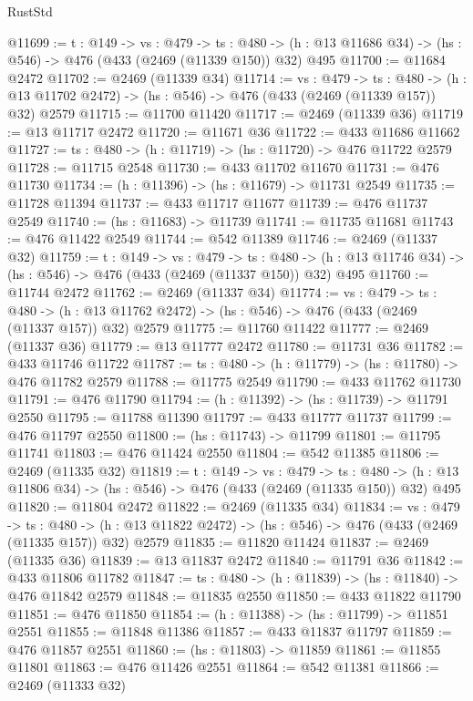 \begin{lexlean}{RustStd}
\begin{coremodule}
@11699 := {t : @149} ->
  {vs : @479} ->
  {ts : @480} -> (h : @13 @11686 @34) -> (hs : @546) -> @476 (@433 (@2469 (@11339 @150)) @32) @495
@11700 := @11684 @2472
@11702 := @2469 (@11339 @34)
@11714 := {vs : @479} ->
  {ts : @480} ->
  (h : @13 @11702 @2472) -> (hs : @546) -> @476 (@433 (@2469 (@11339 @157)) @32) @2579
@11715 := @11700 @11420
@11717 := @2469 (@11339 @36)
@11719 := @13 @11717 @2472
@11720 := @11671 @36
@11722 := @433 @11686 @11662
@11727 := {ts : @480} -> (h : @11719) -> (hs : @11720) -> @476 @11722 @2579
@11728 := @11715 @2548
@11730 := @433 @11702 @11670
@11731 := @476 @11730
@11734 := (h : @11396) -> (hs : @11679) -> @11731 @2549
@11735 := @11728 @11394
@11737 := @433 @11717 @11677
@11739 := @476 @11737 @2549
@11740 := (hs : @11683) -> @11739
@11741 := @11735 @11681
@11743 := @476 @11422 @2549
@11744 := @542 @11389
@11746 := @2469 (@11337 @32)
@11759 := {t : @149} ->
  {vs : @479} ->
  {ts : @480} -> (h : @13 @11746 @34) -> (hs : @546) -> @476 (@433 (@2469 (@11337 @150)) @32) @495
@11760 := @11744 @2472
@11762 := @2469 (@11337 @34)
@11774 := {vs : @479} ->
  {ts : @480} ->
  (h : @13 @11762 @2472) -> (hs : @546) -> @476 (@433 (@2469 (@11337 @157)) @32) @2579
@11775 := @11760 @11422
@11777 := @2469 (@11337 @36)
@11779 := @13 @11777 @2472
@11780 := @11731 @36
@11782 := @433 @11746 @11722
@11787 := {ts : @480} -> (h : @11779) -> (hs : @11780) -> @476 @11782 @2579
@11788 := @11775 @2549
@11790 := @433 @11762 @11730
@11791 := @476 @11790
@11794 := (h : @11392) -> (hs : @11739) -> @11791 @2550
@11795 := @11788 @11390
@11797 := @433 @11777 @11737
@11799 := @476 @11797 @2550
@11800 := (hs : @11743) -> @11799
@11801 := @11795 @11741
@11803 := @476 @11424 @2550
@11804 := @542 @11385
@11806 := @2469 (@11335 @32)
@11819 := {t : @149} ->
  {vs : @479} ->
  {ts : @480} -> (h : @13 @11806 @34) -> (hs : @546) -> @476 (@433 (@2469 (@11335 @150)) @32) @495
@11820 := @11804 @2472
@11822 := @2469 (@11335 @34)
@11834 := {vs : @479} ->
  {ts : @480} ->
  (h : @13 @11822 @2472) -> (hs : @546) -> @476 (@433 (@2469 (@11335 @157)) @32) @2579
@11835 := @11820 @11424
@11837 := @2469 (@11335 @36)
@11839 := @13 @11837 @2472
@11840 := @11791 @36
@11842 := @433 @11806 @11782
@11847 := {ts : @480} -> (h : @11839) -> (hs : @11840) -> @476 @11842 @2579
@11848 := @11835 @2550
@11850 := @433 @11822 @11790
@11851 := @476 @11850
@11854 := (h : @11388) -> (hs : @11799) -> @11851 @2551
@11855 := @11848 @11386
@11857 := @433 @11837 @11797
@11859 := @476 @11857 @2551
@11860 := (hs : @11803) -> @11859
@11861 := @11855 @11801
@11863 := @476 @11426 @2551
@11864 := @542 @11381
@11866 := @2469 (@11333 @32)

\end{coremodule}
\end{lexlean}
